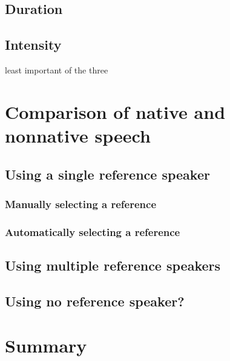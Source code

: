 	\subsection{Duration}
	\label{sec:prosody:duration}
	
	\subsection{Intensity}
	\label{sec:prosody:intensity}
		least important of the three \citep{Cutler2005}
	
\section{Comparison of native and nonnative speech}
\label{sec:diag:compare}

		\cite{Probst2002}
		
	\subsection{Using a single reference speaker}
	\label{sec:compare:single}
	
		\subsubsection{Manually selecting a reference}
		\label{sec:compare:single:manual}
		
		\subsubsection{Automatically selecting a reference}
		\label{sec:compare:single:auto}
		
	\subsection{Using multiple reference speakers}
	\label{sec:compare:multi}
	
	\subsection{Using no reference speaker?}
	\label{sec:compare:noref}
		\cite{Duong2011}

		
\section{Summary}
\label{sec:diag:summary}